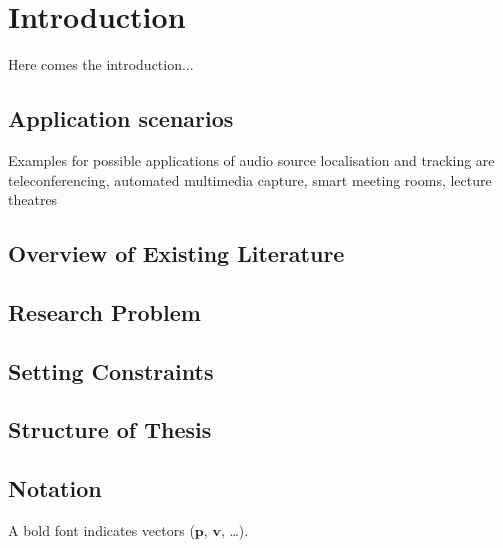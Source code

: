 \chapter{Introduction}
Here comes the introduction...
\section{Application scenarios}
Examples for possible applications of audio source localisation and tracking are teleconferencing, automated multimedia capture, smart meeting rooms, lecture theatres \cite{Lehmann2007}
\section{Overview of Existing Literature}
\section{Research Problem}
\section{Setting Constraints}
\section{Structure of Thesis}
\section{Notation}
A bold font indicates vectors ($\mathbf{p}$, $\mathbf{v}$, \dots).
